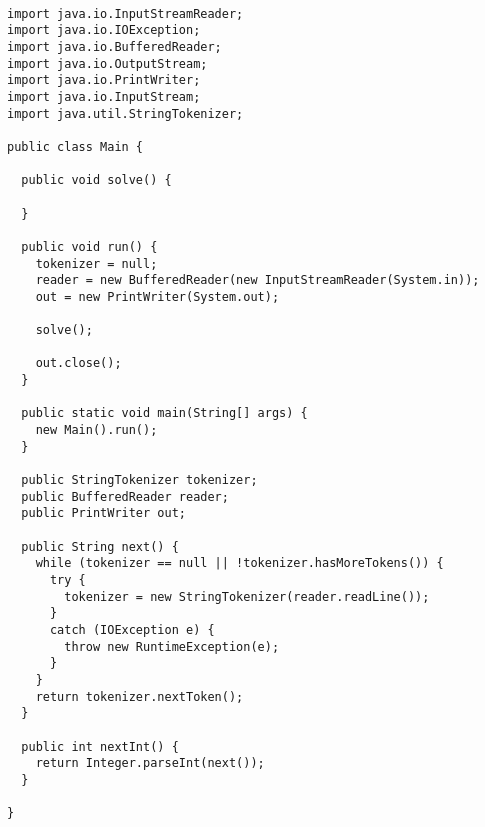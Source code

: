 \begin{lstlisting}

import java.io.InputStreamReader;
import java.io.IOException;
import java.io.BufferedReader;
import java.io.OutputStream;
import java.io.PrintWriter;
import java.io.InputStream;
import java.util.StringTokenizer;

public class Main {

  public void solve() {

  }

  public void run() {
    tokenizer = null;
    reader = new BufferedReader(new InputStreamReader(System.in));
    out = new PrintWriter(System.out);

    solve();

    out.close();
  }

  public static void main(String[] args) {
    new Main().run();
  }

  public StringTokenizer tokenizer;
  public BufferedReader reader;
  public PrintWriter out;

  public String next() {
    while (tokenizer == null || !tokenizer.hasMoreTokens()) {
      try {
        tokenizer = new StringTokenizer(reader.readLine());
      }
      catch (IOException e) {
        throw new RuntimeException(e);
      }
    }
    return tokenizer.nextToken();
  }

  public int nextInt() {
    return Integer.parseInt(next());
  }

}

\end{lstlisting}
